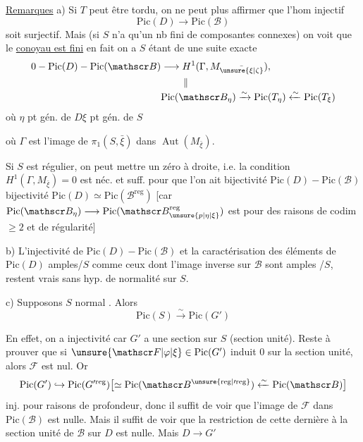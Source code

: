 \uline{Remarques} a) Si $T$ peut être tordu, on ne peut plus affirmer que l'hom injectif
\[
\mathrm{Pic}(D)\longrightarrow\mathrm{Pic}(\mathscr B)
\]
soit surjectif. Mais (si $S$  n'a qu'un nb fini de composantes connexes) on voit que le \uline{conoyau est fini} en fait on a  $S$ étant de  une suite exacte
\[
\begin{aligned}
0-\mathrm{Pic}(D)-\mathrm{Pic}(\mathscr B)&\longrightarrow H^1(\Gamma,M_{\bar{\unsure{\xi|\zeta}}}),\\[-1pt]
&\hspace{8mm}\Vert\\[-2pt]
&\mathrm{Pic}(\mathscr B_\eta)\xrightarrow{\sim}\mathrm{Pic}(T_\eta)\xleftarrow{\sim}\mathrm{Pic}(T_\xi)
\end{aligned}
\]
où $\eta$ pt gén. de $D$\quad $\xi$ pt gén. de $S$

 où $\Gamma$ est l'image de $\pi_1(S,\bar\xi)$ dans $\operatorname{Aut}(M_{\bar\xi})$.

Si $S$ est régulier,  on peut mettre un zéro à droite, i.e. la condition $H^1(\Gamma,M_{\bar\xi})=0$ est néc. et suff. pour que l'on ait bijectivité $\mathrm{Pic}(D)-\mathrm{Pic}(\mathscr B)$   bijectivité $\mathrm{Pic}(D)\simeq\mathrm{Pic}(\mathscr B^{\mathrm{reg}})$ [car $\mathrm{Pic}(\mathscr B_\eta)\longrightarrow\mathrm{Pic}(\mathscr B_{\unsure{p|\eta|\xi}}^{\mathrm{reg}})$ est   pour des raisons de codim $\geq 2$ et de régularité]

b) L'injectivité de $\mathrm{Pic}(D)-\mathrm{Pic}(\mathscr B)$ et la caractérisation des éléments de $\mathrm{Pic}(D)$ amples/$S$ comme ceux dont l'image inverse sur $\mathscr B$ sont amples /$S$, restent vrais sans hyp. de normalité sur $S$.

c) Supposons $S$ normal . Alors
\[
\mathrm{Pic}(S)\xrightarrow{\sim}\mathrm{Pic}(G')
\]

En effet, on  a injectivité car $G'$ a une section sur $S$ (section unité). Reste à prouver que si $\unsure{\mathscr F|\varphi|\xi}\in\mathrm{Pic}(G')$ induit 0 sur la section unité, alors $\mathscr F$ est nul. Or
\[
\mathrm{Pic}(G')\hookrightarrow\mathrm{Pic}(G'^{\mathrm{reg}})\bigl[\simeq\mathrm{Pic}(\mathscr B^{\unsure{\mathrm{reg}|\prime\mathrm{reg}}})\xleftarrow{\sim}\mathrm{Pic}(\mathscr B)\bigr]
\]
inj. pour raisons de profondeur, donc il suffit  de voir que l'image  de $\mathscr F$ dans $\mathrm{Pic}(\mathscr B)$ est nulle. Mais il suffit de voir que la restriction de cette dernière à la section unité de $\mathscr B$ sur $D$ est nulle. Mais $D\longrightarrow G'$
